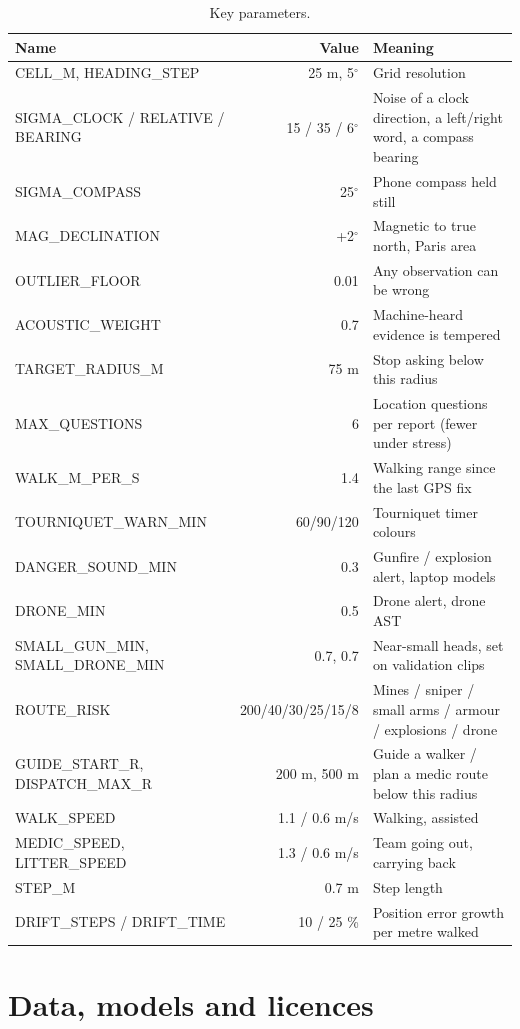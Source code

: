 \begin{table}[htbp]\centering\small
\caption{Key parameters.}\label{tab:params}
\begin{tabularx}{\linewidth}{>{\ttfamily}lrX}
\toprule
\normalfont Name & Value & Meaning\\
\midrule
CELL\_M, HEADING\_STEP & 25 m, 5$^\circ$ & Grid resolution\\
SIGMA\_CLOCK / RELATIVE / BEARING & 15 / 35 / 6$^\circ$ & Noise of a clock direction, a left/right word, a compass bearing\\
SIGMA\_COMPASS & 25$^\circ$ & Phone compass held still\\
MAG\_DECLINATION & +2$^\circ$ & Magnetic to true north, Paris area\\
OUTLIER\_FLOOR & 0.01 & Any observation can be wrong\\
ACOUSTIC\_WEIGHT & 0.7 & Machine-heard evidence is tempered\\
TARGET\_RADIUS\_M & 75 m & Stop asking below this radius\\
MAX\_QUESTIONS & 6 & Location questions per report (fewer under stress)\\
WALK\_M\_PER\_S & 1.4 & Walking range since the last GPS fix\\
TOURNIQUET\_WARN\_MIN & 60/90/120 & Tourniquet timer colours\\
DANGER\_SOUND\_MIN & 0.3 & Gunfire / explosion alert, laptop models\\
DRONE\_MIN & 0.5 & Drone alert, drone AST\\
SMALL\_GUN\_MIN, SMALL\_DRONE\_MIN & 0.7, 0.7 & Near-small heads, set on validation clips\\
ROUTE\_RISK & 200/40/30/25/15/8 & Mines / sniper / small arms / armour / explosions / drone\\
GUIDE\_START\_R, DISPATCH\_MAX\_R & 200 m, 500 m & Guide a walker / plan a medic route below this radius\\
WALK\_SPEED & 1.1 / 0.6 m/s & Walking, assisted\\
MEDIC\_SPEED, LITTER\_SPEED & 1.3 / 0.6 m/s & Team going out, carrying back\\
STEP\_M & 0.7 m & Step length\\
DRIFT\_STEPS / DRIFT\_TIME & 10 / 25 \% & Position error growth per metre walked\\
\bottomrule
\end{tabularx}
\end{table}

\chapter{Data, models and licences}\label{app:data}

